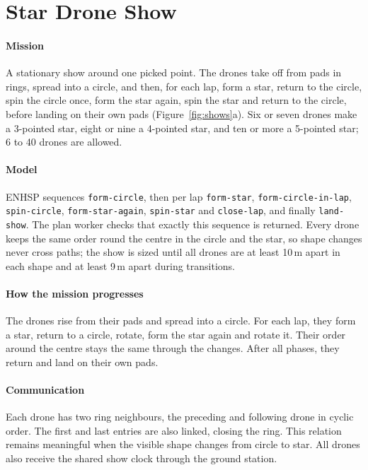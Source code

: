 \documentclass[11pt,a4paper,oneside]{report}
\newcommand{\code}[1]{\texttt{#1}}
\begin{document}
\section{Star Drone Show}
\paragraph{Mission}
A stationary show around one picked point. The drones take off from pads in rings, spread into a
circle, and then, for each lap, form a star, return to the circle, spin the circle once, form the
star again, spin the star and return to the circle, before landing on their own pads
(Figure~\ref{fig:shows}a). Six or seven drones make a 3-pointed star, eight or nine a 4-pointed
star, and ten or more a 5-pointed star; 6 to 40 drones are allowed.

\paragraph{Model}
ENHSP sequences \code{form-circle}, then per lap \code{form-star}, \code{form-circle-in-lap},
\code{spin-circle}, \code{form-star-again}, \code{spin-star} and \code{close-lap}, and finally
\code{land-show}. The plan worker checks that exactly this sequence is returned. Every drone keeps
the same order round the centre in the circle and the star, so shape changes never cross paths;
the show is sized until all drones are at least 10\,m apart in each shape and at least 9\,m apart
during transitions.


\paragraph{How the mission progresses}
The drones rise from their pads and spread into a circle. For each lap, they form a star, return to a circle, rotate, form the star again and rotate it. Their order around the centre stays the same through the changes. After all phases, they return and land on their own pads.

\paragraph{Communication}
Each drone has two ring neighbours, the preceding and following drone in cyclic order. The first and last entries are also linked, closing the ring. This relation remains meaningful when the visible shape changes from circle to star. All drones also receive the shared show clock through the ground station.
\end{document}
